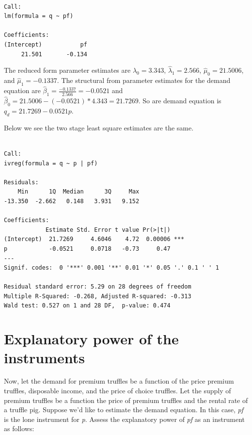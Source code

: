 \documentclass[]{book}
\newenvironment{Shaded}{\begin{snugshade}}{\end{snugshade}}
\newcommand{\KeywordTok}[1]{\textcolor[rgb]{0.13,0.29,0.53}{\textbf{#1}}}
\newcommand{\NormalTok}[1]{#1}
\newcommand{\OperatorTok}[1]{\textcolor[rgb]{0.81,0.36,0.00}{\textbf{#1}}}
\newcommand{\StringTok}[1]{\textcolor[rgb]{0.31,0.60,0.02}{#1}}
\begin{document}
\begin{verbatim}

Call:
lm(formula = q ~ pf)

Coefficients:
(Intercept)           pf  
     21.501       -0.134  
\end{verbatim}

The reduced form parameter estimates are \(\hat\lambda_0=3.343\), \(\hat\lambda_1=2.566\), \(\hat\mu_0=21.5006\), and \(\hat\mu_1=-0.1337\). The structural from parameter estimates for the demand equation are \(\hat\beta_1=\frac{-0.1337}{2.566}=-0.0521\) and \(\hat\beta_0=21.5006-(-0.0521)*4.343=21.7269\). So are demand equation is \(q_d=21.7269-0.0521p\).

Below we see the two stage least square estimates are the same.

\begin{Shaded}
\end{Shaded}

\begin{verbatim}

Call:
ivreg(formula = q ~ p | pf)

Residuals:
    Min      1Q  Median      3Q     Max 
-13.350  -2.662   0.148   3.931   9.152 

Coefficients:
            Estimate Std. Error t value Pr(>|t|)    
(Intercept)  21.7269     4.6046    4.72  0.00006 ***
p            -0.0521     0.0718   -0.73     0.47    
---
Signif. codes:  0 '***' 0.001 '**' 0.01 '*' 0.05 '.' 0.1 ' ' 1

Residual standard error: 5.29 on 28 degrees of freedom
Multiple R-Squared: -0.268, Adjusted R-squared: -0.313 
Wald test: 0.527 on 1 and 28 DF,  p-value: 0.474 
\end{verbatim}

\hypertarget{explanatory-power-of-the-instruments}{%
\section{Explanatory power of the instruments}\label{explanatory-power-of-the-instruments}}

Now, let the demand for premium truffles be a function of the price premium truffles, disposable income, and the price of choice truffles. Let the supply of premium truffles be a function the price of premium truffles and the rental rate of a truffle pig. Suppose we'd like to estimate the demand equation. In this case, \emph{pf} is the lone instrument for \emph{p}. Assess the explanatory power of \emph{pf} as an instrument as follows:
\end{document}
